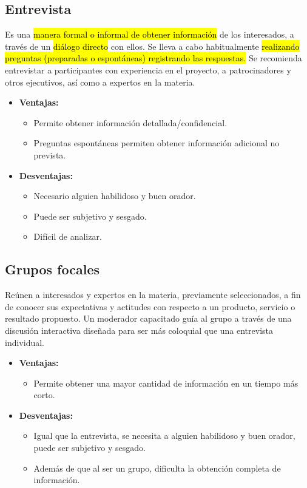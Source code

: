 \documentclass{templateApunte}
\newcommand{\hlcolor}[2]{{\sethlcolor{#1}\hl{#2}}}
\begin{document}
\subsection{Entrevista}\hypertarget{entrevista}{}
Es una \hlcolor{Amarillo}{manera formal o informal de obtener información} de los interesados, a través de un \hlcolor{Amarillo}{diálogo directo} con ellos. Se lleva a cabo habitualmente \hlcolor{Amarillo}{realizando preguntas (preparadas o espontáneas) registrando las respuestas.}
Se recomienda entrevistar a participantes con experiencia en el proyecto, a patrocinadores y otros ejecutivos, así como a expertos en la materia.
\begin{itemize}
  \item \textbf{Ventajas:}
  \begin{itemize}
    \item Permite obtener información detallada/confidencial.
    \item Preguntas espontáneas permiten obtener información adicional no prevista.
  \end{itemize}
  \item \textbf{Desventajas:}
  \begin{itemize}
    \item Necesario alguien habilidoso y buen orador.
    \item Puede ser subjetivo y sesgado.
    \item Difícil de analizar.
  \end{itemize}
\end{itemize}

\newpage
\subsection{Grupos focales}\hypertarget{grupos_focales}{}
Reúnen a interesados y expertos en la materia, previamente seleccionados, a fin de conocer sus expectativas y actitudes con respecto a un producto, servicio o resultado propuesto. Un moderador capacitado guía al grupo a través de una discusión interactiva diseñada para ser más coloquial que una entrevista individual.
\begin{itemize}
  \item \textbf{Ventajas:}
  \begin{itemize}
    \item Permite obtener una mayor cantidad de información en un tiempo más corto.
  \end{itemize}
  \item \textbf{Desventajas:}
  \begin{itemize}
    \item Igual que la entrevista, se necesita a alguien habilidoso y buen orador, puede ser subjetivo y sesgado.
    \item Además de que al ser un grupo, dificulta la obtención completa de información.
  \end{itemize}
\end{itemize}
\end{document}
